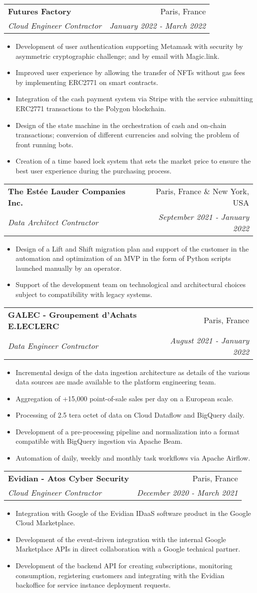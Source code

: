 \documentclass[letterpaper,11pt]{article}
\makeatletter
\newcommand{\resumeItem}[1]{
  \item\small{#1 \vspace{-2pt}}
}
\newcommand{\resumeSubheading}[4]{
  \vspace{-1pt}\item
    \begin{tabular*}{0.97\textwidth}[t]{l@{\extracolsep{\fill}}r}
      \textbf{#1} & #2 \\
      \textit{\small#3} & \textit{\small #4} \\
    \end{tabular*}\vspace{-5pt}
}
\newcommand{\resumeItemListStart}{\begin{itemize}}
\newcommand{\resumeItemListEnd}{\end{itemize}\vspace{-5pt}}
\makeatother
\begin{document}
\resumeSubheading{Futures Factory}
{Paris, France}
{Cloud Engineer Contractor}
{January 2022 - March 2022}
\resumeItemListStart{}
\resumeItem{
  Development of user authentication supporting Metamask with security by
  asymmetric cryptographic challenge; and by email with Magic.link.
}
\resumeItem{
  Improved user experience by allowing the transfer of NFTs without gas fees by
  implementing ERC2771 on smart contracts.
}
\resumeItem{
  Integration of the cash payment system via Stripe with the service submitting
  ERC2771 transactions to the Polygon blockchain.
}
\resumeItem{
  Design of the state machine in the orchestration of cash and on-chain
  transactions; conversion of different currencies and solving the problem of
  front running bots.
}
\resumeItem{
  Creation of a time based lock system that sets the market price to ensure the
  best user experience during the purchasing process.
}
\resumeItemListEnd{}

\resumeSubheading{The Estée Lauder Companies Inc.}
{Paris, France \& New York, USA}
{Data Architect Contractor}
{September 2021 - January 2022}
\resumeItemListStart{}
\resumeItem{
  Design of a Lift and Shift migration plan and support of the customer in the
  automation and optimization of an MVP in the form of Python scripts launched
  manually by an operator.
}
\resumeItem{
  Support of the development team on technological and architectural choices
  subject to compatibility with legacy systems.
}
\resumeItemListEnd{}

\resumeSubheading{GALEC - Groupement d'Achats E.LECLERC}
{Paris, France}
{Data Engineer Contractor}
{August 2021 - January 2022}
\resumeItemListStart{}
\resumeItem{
  Incremental design of the data ingestion architecture as details of the various
  data sources are made available to the platform engineering team.
}
\resumeItem{
  Aggregation of +15,000 point-of-sale sales per day on a European scale.
}
\resumeItem{
  Processing of 2.5 tera octet of data on Cloud Dataflow and BigQuery daily.
}
\resumeItem{
  Development of a pre-processing pipeline and normalization into a format
  compatible with BigQuery ingestion via Apache Beam.
}
\resumeItem{
  Automation of daily, weekly and monthly task workflows via Apache Airflow.
}
\resumeItemListEnd{}

\resumeSubheading{Evidian - Atos Cyber Security}
{Paris, France}
{Cloud Engineer Contractor}
{December 2020 - March 2021}
\resumeItemListStart{}
\resumeItem{
  Integration with Google of the Evidian IDaaS software product in the Google
  Cloud Marketplace.
}
\resumeItem{
  Development of the event-driven integration with the internal Google Marketplace
  APIs in direct collaboration with a Google technical partner.
}
\resumeItem{
  Development of the backend API for creating subscriptions, monitoring
  consumption, registering customers and integrating with the Evidian backoffice
  for service instance deployment requests.
}
\resumeItemListEnd{}
\end{document}
